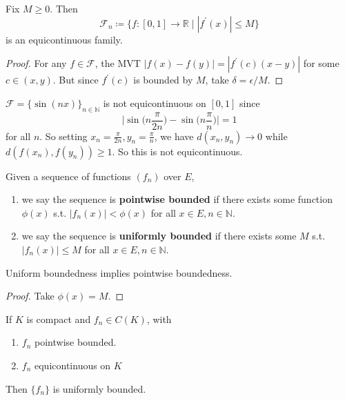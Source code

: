   \begin{lemma}
    Fix $M \geq 0$. Then 
    \begin{equation}
      \mathcal{F}_n \coloneqq \{f : [0, 1] \to \mathbb{R} \mid |f^\prime (x)| \leq M \} 
    \end{equation}
    is an equicontinuous family. 
  \end{lemma}
  \begin{proof}
    For any $f \in \mathcal{F}$, the MVT $|f(x) - f(y)| = |f^\prime (c) (x - y)|$ for some $c \in (x, y)$. But since $f^\prime (c)$ is bounded by $M$, take $\delta = \epsilon/M$. 
  \end{proof}

  \begin{example}
    $\mathcal{F} = \{\sin(nx)\}_{n \in \mathbb{N}}$ is not equicontinuous on $[0, 1]$ since 
    \begin{equation}
      \bigg| \sin\Big( n \frac{\pi}{2n} \Big) - \sin \Big( n \frac{\pi}{n} \Big) \bigg| = 1
    \end{equation}
    for all $n$. So setting $x_n = \frac{\pi}{2n}, y_n = \frac{\pi}{n}$, we have $d(x_n, y_n) \to 0$ while $d(f(x_n), f(y_n)) \geq 1$. So this is not equicontinuous. 
  \end{example} 

  \begin{definition}
    Given a sequence of functions $(f_n)$ over $E$, 
    \begin{enumerate}
      \item we say the sequence is \textbf{pointwise bounded} if there exists some function $\phi(x)$ s.t. $|f_n (x)| < \phi(x)$ for all $x \in E, n \in \mathbb{N}$. 
      \item we say the sequence is \textbf{uniformly bounded} if there exists some $M$ s.t. $|f_n (x)| \leq M$ for all $x \in E, n \in \mathbb{N}$. 
    \end{enumerate}
  \end{definition}

  \begin{lemma} 
    Uniform boundedness implies pointwise boundedness. 
  \end{lemma}
  \begin{proof}
    Take $\phi(x) = M$. 
  \end{proof}

  \begin{lemma} 
    If $K$ is compact and $f_n \in C(K)$, with 
    \begin{enumerate}
      \item $f_n$ pointwise bounded. 
      \item $f_n$ equicontinuous on $K$
    \end{enumerate}
    Then $\{f_n\}$ is uniformly bounded. 
  \end{lemma}

